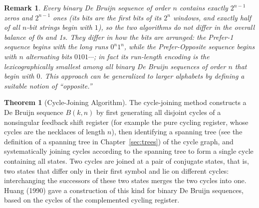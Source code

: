 \documentclass{article}
\newtheorem{remark}{Remark}
\theoremstyle{definition}
\newtheorem{theorem}{Theorem}
\begin{document}
\begin{remark}
Every binary De Bruijn sequence of order $n$ contains exactly $2^{n-1}$ zeros and $2^{n-1}$ ones (its bits are the first bits of its $2^n$ windows, and exactly half of all $n$-bit strings begin with $1$), so the two algorithms do not differ in the overall balance of 0s and 1s. They differ in how the bits are arranged: the Prefer-1 sequence begins with the long runs $0^n 1^n$, while the Prefer-Opposite sequence begins with $n$ alternating bits $0101\cdots$; in fact its run-length encoding is the lexicographically smallest among all binary De Bruijn sequences of order $n$ that begin with $0$. This approach can be generalized to larger alphabets by defining a suitable notion of ``opposite.''
\end{remark}
\begin{theorem}[Cycle-Joining Algorithm]
The cycle-joining method constructs a De Bruijn sequence $B(k, n)$ by first generating all disjoint cycles of a nonsingular feedback shift register (for example the pure cycling register, whose cycles are the necklaces of length $n$), then identifying a spanning tree (see the definition of a spanning tree in Chapter~\ref{sec:trees}) of the cycle graph, and systematically joining cycles according to the spanning tree to form a single cycle containing all states. Two cycles are joined at a pair of conjugate states, that is, two states that differ only in their first symbol and lie on different cycles: interchanging the successors of these two states merges the two cycles into one. Huang (1990) gave a construction of this kind for binary De Bruijn sequences, based on the cycles of the complemented cycling register.
\end{theorem}
\end{document}
